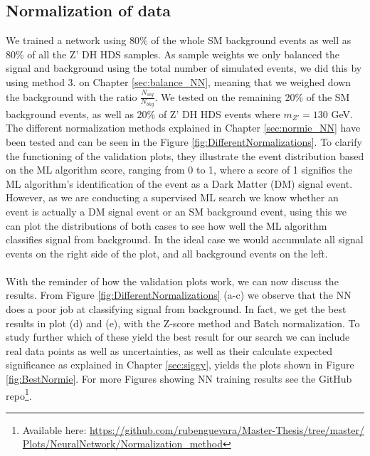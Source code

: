 \documentclass[12pt, a4paper]{book}
\begin{document}
\subsection{Normalization of data}\label{sec:normie_NN_res}
We trained a network using 80\% of the whole SM background events as well as 80\% of all the Z' DH HDS samples. As sample weights we only balanced the signal and background using the total number of simulated events, we did this by using method 3. on Chapter \ref{sec:balance_NN}, meaning that we weighed down the background with the ratio $\frac{N_{sig}}{N_{bkg}}$. 
We tested on the remaining 20\% of the SM background events, as well as 20\% of Z' DH HDS events where $m_{Z'} =130$ GeV. The different normalization methods explained in Chapter \ref{sec:normie_NN} have been tested and can be seen in the Figure \ref{fig:DifferentNormalizations}. 
To clarify the functioning of the validation plots, they illustrate the event distribution based on the ML algorithm score, ranging from 0 to 1, where a score of 1 signifies the ML algorithm's identification of the event as a Dark Matter (DM) signal event.
However, as we are conducting a supervised ML search we know whether an event is actually a DM signal event or an SM background event, using this we can plot the distributions of both cases to see how well the ML algorithm classifies signal from background. In the ideal case we would accumulate 
all signal events on the right side of the plot, and all background events on the left.\\
\\With the reminder of how the validation plots work, we can now discuss the results. From Figure \ref{fig:DifferentNormalizations} (a-c) we observe that the NN does a poor job at classifying signal from background. 
In fact, we get the best results in plot (d) and (e), with the Z-score method and Batch normalization. To study further which of these yield the best result for our search we can include real data points as well as uncertainties, 
as well as their calculate expected significance as explained in Chapter \ref{sec:siggy}, yields the plots shown in Figure \ref{fig:BestNormie}. For more Figures showing NN training results see the GitHub 
repo\footnote{Available here: \href{https://github.com/rubenguevara/Master-Thesis/tree/master/Plots/NeuralNetwork/Normalization_method}{https://github.com/rubenguevara/Master-Thesis/tree/master/\\Plots/NeuralNetwork/Normalization\_method}}. 
\graphicspath{{../../Plots/NeuralNetwork/Normalization_method/}}
\end{document}
